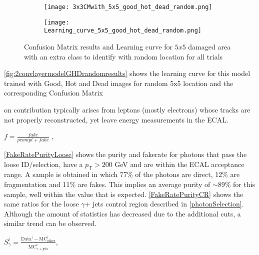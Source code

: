 \begin{figure}
	\begin{subfigure}{.45\textwidth}
 		\texttt{[image: 3x3CMwith\_5x5\_good\_hot\_dead\_random.png]}
 	\end{subfigure}
 	\begin{subfigure}{.45\textwidth}
 	\texttt{[image: Learning\_curve\_5x5\_good\_hot\_dead\_random.png]}
 	\end{subfigure}
 \caption{Confusion Matrix results and Learning curve
	 for $5x5$ damaged area with an extra class to identify with random location for all trials\label{fig:2convlayermodelGHDrandomresults}}
 \end{figure}
 
\autoref{fig:2convlayermodelGHDrandomresults} shows the learning curve for this model trained with Good, Hot and Dead images for random 5x5 location and the corresponding Confusion Matrix


 on contribution typically arises from leptons (mostly electrons) whose tracks are not properly reconstructed, yet leave energy measurements in the ECAL.

\begingroup
	\large
	\begin{center}
		$f = \frac{fake}{prompt+fake}$ ,
	\end{center}
\endgroup
\vspace{1em}

\autoref{FakeRatePurityLoose} shows the purity and fakerate for photons that pass the loose ID/selection, have a $p_\text{T} > 200$ GeV and are within the ECAL acceptance range. A sample is obtained in which 77\% of the photons are direct, 12\% are fragmentation and 11\% are fakes. This implies an average purity of $\sim$89\% for this sample, well within the value that is expected. \autoref{FakeRatePurityCR} shows the same ratios for the loose $\gamma$+ jets control region described in \autoref{photonSelection}. Although the amount of statistics has decreased due to the additional cuts, a similar trend can be observed.


\begingroup
	\Large
	\begin{center}
		$S^{i}_{\gamma} = \frac{\text{Data}^{i} - \text{M}\text{C}^{i}_\text{other}}{\text{M}\text{C}_{\gamma+\text{jets}}^i}$,
	\end{center}
\endgroup

